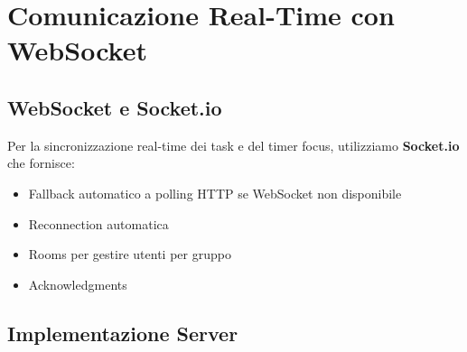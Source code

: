 \documentclass[12pt,a4paper]{report}
\begin{document}
\newpage

\chapter{Comunicazione Real-Time con WebSocket}

\section{WebSocket e Socket.io}

Per la sincronizzazione real-time dei task e del timer focus, utilizziamo \textbf{Socket.io} che fornisce:

\begin{itemize}
    \item Fallback automatico a polling HTTP se WebSocket non disponibile
    \item Reconnection automatica
    \item Rooms per gestire utenti per gruppo
    \item Acknowledgments
\end{itemize}

\section{Implementazione Server}
\end{document}
